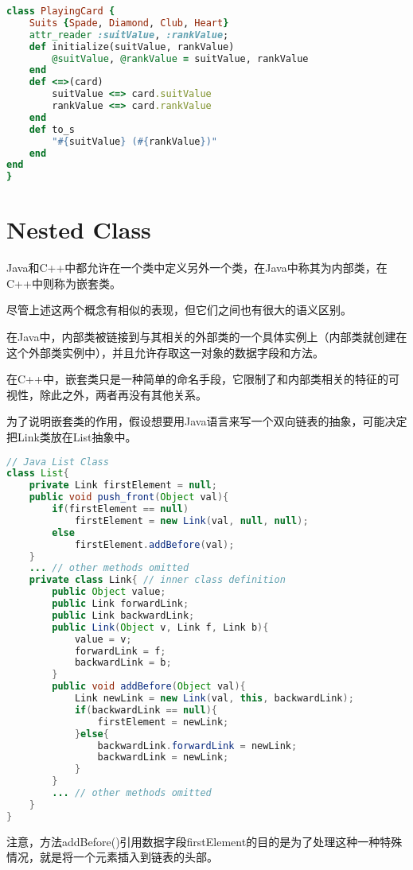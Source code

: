 \begin{lstlisting}[language=Ruby]
class PlayingCard {
	Suits {Spade, Diamond, Club, Heart}
	attr_reader :suitValue, :rankValue;
	def initialize(suitValue, rankValue)
		@suitValue, @rankValue = suitValue, rankValue
	end
	def <=>(card)
		suitValue <=> card.suitValue
		rankValue <=> card.rankValue
	end
	def to_s
		"#{suitValue} (#{rankValue})"
	end
end
}
\end{lstlisting}







\section{Nested Class}

Java和C++中都允许在一个类中定义另外一个类，在Java中称其为内部类，在C++中则称为嵌套类。


尽管上述这两个概念有相似的表现，但它们之间也有很大的语义区别。

在Java中，内部类被链接到与其相关的外部类的一个具体实例上（内部类就创建在这个外部类实例中），并且允许存取这一对象的数据字段和方法。

在C++中，嵌套类只是一种简单的命名手段，它限制了和内部类相关的特征的可视性，除此之外，两者再没有其他关系。

为了说明嵌套类的作用，假设想要用Java语言来写一个双向链表的抽象，可能决定把Link类放在List抽象中。



\begin{lstlisting}[language=Java]
// Java List Class
class List{
	private Link firstElement = null;
	public void push_front(Object val){
		if(firstElement == null)
			firstElement = new Link(val, null, null);
		else
			firstElement.addBefore(val);
	}
	... // other methods omitted 
	private class Link{ // inner class definition
		public Object value;
		public Link forwardLink;
		public Link backwardLink;
		public Link(Object v, Link f, Link b){
			value = v;
			forwardLink = f;
			backwardLink = b;
		}
		public void addBefore(Object val){
			Link newLink = new Link(val, this, backwardLink);
			if(backwardLink == null){
				firstElement = newLink;
			}else{
				backwardLink.forwardLink = newLink;
				backwardLink = newLink;
			}
		}
		... // other methods omitted
	}
}
\end{lstlisting}

注意，方法addBefore()引用数据字段firstElement的目的是为了处理这种一种特殊情况，就是将一个元素插入到链表的头部。

